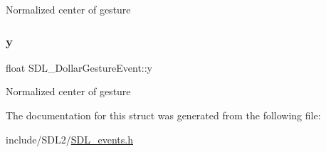 Normalized center of gesture \mbox{\label{struct_s_d_l___dollar_gesture_event_a293b2303acc1cfc63c167c5525e6eab5}} 
\subsubsection{\texorpdfstring{y}{y}}
{\footnotesize\ttfamily float S\+D\+L\+\_\+\+Dollar\+Gesture\+Event\+::y}

Normalized center of gesture 

The documentation for this struct was generated from the following file\+:\begin{DoxyCompactItemize}
\item 
include/\+S\+D\+L2/\hyperlink{_s_d_l__events_8h}{S\+D\+L\+\_\+events.\+h}\end{DoxyCompactItemize}
